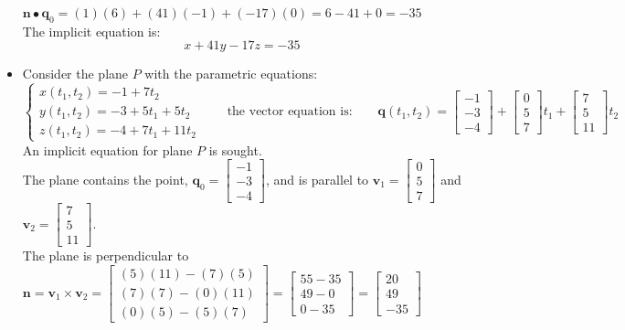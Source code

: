 \documentclass{article}
\begin{document}
\begin{itemize}
\(\mathbf{n} \bullet \mathbf{q}_0 = (1)(6) + (41)(-1) + (-17)(0) = 6 - 41 + 0 = -35\) \\ 
The implicit equation is:
\[x + 41y - 17z = -35\]
\item Consider the plane \(P\) with the parametric equations: 
\[\left\{\begin{array}{c} x(t_1, t_2) = -1 + 7t_2 \\ y(t_1, t_2) = -3 + 5t_1 + 5t_2 \\ z(t_1, t_2) = -4 + 7t_1 + 11t_2 \end{array}\right.
\quad\quad\text{the vector equation is:}\quad\quad
\mathbf{q}(t_1, t_2) = \begin{bmatrix} -1 \\ -3 \\ -4 \end{bmatrix} + \begin{bmatrix} 0 \\ 5 \\ 7 \end{bmatrix}t_1 + \begin{bmatrix} 7 \\ 5 \\ 11 \end{bmatrix}t_2\]
An implicit equation for plane \(P\) is sought. \\  
The plane contains the point, \(\mathbf{q}_0 = \begin{bmatrix} -1 \\ -3 \\ -4 \end{bmatrix}\), and is parallel to \(\mathbf{v}_1 = \begin{bmatrix} 0 \\ 5 \\ 7 \end{bmatrix}\) and \(\mathbf{v}_2 = \begin{bmatrix} 7 \\ 5 \\ 11 \end{bmatrix}\). \\
The plane is perpendicular to \(\mathbf{n} = \mathbf{v}_1 \times \mathbf{v}_2 = \begin{bmatrix} (5)(11) - (7)(5) \\ (7)(7) - (0)(11) \\ (0)(5) - (5)(7) \end{bmatrix} = \begin{bmatrix} 55 - 35 \\ 49 - 0 \\ 0 - 35 \end{bmatrix} = \begin{bmatrix} 20 \\ 49 \\ -35 \end{bmatrix}\) \\  

\end{itemize}
\end{document}
